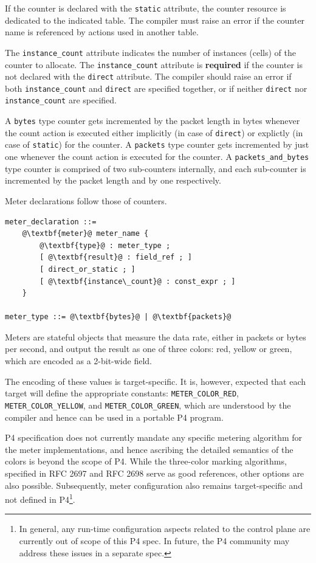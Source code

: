\documentclass[12pt]{article}
\begin{document}
If the counter is declared with the \texttt{static} attribute, the
counter resource is dedicated to the indicated table. The compiler
must raise an error if the counter name is referenced by actions used
in another table.

The \texttt{instance_count} attribute indicates the number of
instances (cells) of the counter to allocate. The
\texttt{instance_count} attribute is \textbf{required} if the counter
is not declared with the \texttt{direct} attribute.  The compiler
should raise an error if both \texttt{instance_count} and
\texttt{direct} are specified together, or if neither \texttt{direct}
nor \texttt{instance_count} are specified.

A \texttt{bytes} type counter gets incremented by the packet length in bytes
whenever the count action is executed either implicitly (in case of
\texttt{direct}) or explictly (in case of \texttt{static}) for the counter.
A \texttt{packets} type counter gets incremented by just one whenever
the count action is executed for the counter.
A \texttt{packets_and_bytes} type counter is comprised of two sub-counters
internally, and each sub-counter is incremented by the packet length and
by one respectively.



Meter declarations follow those of counters.

\begin{lstlisting}[frame=single,backgroundcolor=\color{bnfgreen},escapechar=\@]
meter_declaration ::=
    @\textbf{meter}@ meter_name {
        @\textbf{type}@ : meter_type ;
        [ @\textbf{result}@ : field_ref ; ]
        [ direct_or_static ; ]
        [ @\textbf{instance\_count}@ : const_expr ; ]
    }

meter_type ::= @\textbf{bytes}@ | @\textbf{packets}@
\end{lstlisting}

Meters are stateful objects that measure the data rate, either in
packets or bytes per second, and output the result as one of three
colors: red, yellow or green, which are encoded as a 2-bit-wide field.

The encoding of these values is target-specific. It is, however,
expected that each target will define the appropriate constants:
\texttt{METER_COLOR_RED}, \texttt{METER_COLOR_YELLOW},
and \texttt{METER_COLOR_GREEN}, which are understood by the compiler
and hence can be used in a portable P4 program.

P4 specification does not currently mandate any specific metering
algorithm for the meter implementations, and hence ascribing the
detailed semantics of the colors is beyond the scope of P4. While
the three-color marking algorithms, specified in RFC 2697 and RFC 2698
serve as good references, other options are also possible. Subsequently,
meter configuration also remains target-specific and not defined
in P4\footnote{In general, any run-time configuration aspects related
to the control plane are currently out of scope of this P4 spec. In future,
the P4 community may address these issues in a separate spec.}.
\end{document}
